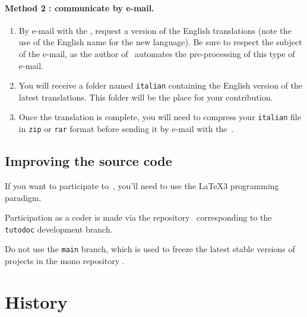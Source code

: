 \paragraph{Method 2 : communicate by e-mail.}

\begin{enumerate}
      \item By e-mail with the , request a version of the English translations (note the use of the English name for the new language).
    Be sure to respect the subject of the e-mail, as the author of \thisproj\ automates the pre-processing of this type of e-mail.

      \item You will receive a folder named \verb#italian# containing the English version of the latest translations.
    This folder will be the place for your contribution.

      \item Once the translation is complete, you will need to compress your \verb#italian# file in \verb#zip# or \verb#rar# format before sending it by e-mail with the \,.
\end{enumerate}



\subsection{Improving the source code}

\begin{tdocimp}
    If you want to participate to \thisproj\,, you'll need to use the \LaTeX3 programming paradigm.
\end{tdocimp}


Participation as a coder is made via the repository \thisrepo\ corresponding to the \verb#tutodoc# development branch.


\begin{tdoccaut}
Do not use the \verb#main# branch, which is used to freeze the latest stable versions of projects in the mono repository \thismonorepo.
\end{tdoccaut}


\section{History}


